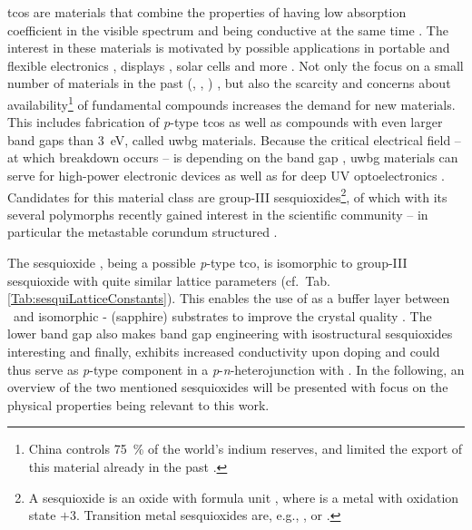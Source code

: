 \glspl{tco} are materials that combine the properties of having low absorption coefficient in the visible spectrum and being conductive at the same time
    \cite{ginley2011}.
The interest in these materials is motivated by possible applications in portable and flexible electronics
    \cite{guillen2011},
displays
    \cite{singh2024},
solar cells
    \cite{chavan2023}
and more
    \cite{ginley2011}.
Not only the focus on a small number of materials in the past (, , )
    \cite{ginley2011},
but also the scarcity and concerns about availability\footnote{
    China controls \qty{75}{\percent} of the world's indium reserves, and limited the export of this material already in the past \cite{candelise2011}.
} of fundamental compounds
    \cite{candelise2011}
increases the demand for new materials.
This includes fabrication of \textit{p}-type \glspl{tco} as well as compounds with even larger band gaps than \qty{3}{eV}, called \gls{uwbg} materials.
Because the critical electrical field -- at which breakdown occurs -- is depending on the band gap
    \cite{slobodyan2022},
\gls{uwbg} materials can serve for high-power electronic devices as well as for deep \gls{UV} optoelectronics
    \cite{wong2021}.
Candidates for this material class are group-III sesquioxides\footnote{
    A sesquioxide is an oxide with formula unit , where  is a metal with oxidation state $+3$.
    Transition metal sesquioxides are, e.g., ,  or .
},
of which  with its several polymorphs
    \cite{hassa2021a}
recently gained interest in the scientific community -- in particular the metastable corundum structured \agao.

The sesquioxide \cro, being a possible \textit{p}-type \gls{tco}, is isomorphic to group-III sesquioxide \agao{} with quite similar lattice parameters (cf.\ Tab.\,\ref{Tab:sesquiLatticeConstants}).
This enables the use of  as a buffer layer between \agao\ and isomorphic \textalpha- (sapphire) substrates to improve the crystal quality
    \cite{stepanov2021}.
The lower band gap also makes band gap engineering with isostructural sesquioxides interesting
    \cite{kaneko2010}
and finally,  exhibits increased conductivity upon doping
    \cite{uekawa1996}
and could thus serve as \textit{p}-type component in a \textit{p}-\textit{n}-heterojunction with \agao{}.
In the following, an overview of the two mentioned sesquioxides will be presented with focus on the physical properties being relevant to this work.